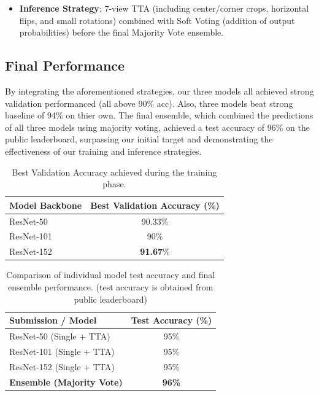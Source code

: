 \documentclass[a4paper, twocolumn]{article} %
\begin{document}
\begin{itemize}
\begin{itemize}
        \item \textbf{Backbone Freezing}: During the Warmup phase, the backbone was frozen to allow the new classification head to stabilize before fine-tuning the entire network. 5 epochs for ResNet-50 and ResNet-101, 10 epochs for ResNet-152.
    \end{itemize}
    \item \textbf{Inference Strategy}: 7-view TTA (including center/corner crops, horizontal flips, and small rotations) combined with Soft Voting (addition of output probabilities) before the final Majority Vote ensemble.
\end{itemize}

\subsection{Final Performance}
By integrating the aforementioned strategies, our three models all achieved strong validation performanced (all above 90\% acc). Also, three models beat strong baseline of 94\% on thier own. The final ensemble, which combined the predictions of all three models using majority voting, achieved a test accuracy of 96\% on the public leaderboard, surpassing our initial target and demonstrating the effectiveness of our training and inference strategies.
\begin{table}[h]
\centering
\caption{Best Validation Accuracy achieved during the training phase.}
\label{tab:val_acc}
\begin{tabular}{@{}lc@{}}
\toprule
\textbf{Model Backbone} & \textbf{Best Validation Accuracy (\%)} \\ \midrule
ResNet-50               & 90.33\%                    \\
ResNet-101              & 90\%                    \\
ResNet-152              & \textbf{91.67}\%                    \\ \bottomrule
\end{tabular}
\end{table}

\begin{table}[h]
\centering
\caption{Comparison of individual model test accuracy and final ensemble performance. (test accuracy is obtained from public leaderboard)}
\label{tab:test_acc}
\begin{tabular}{@{}lc@{}}
\toprule
\textbf{Submission / Model} & \textbf{Test Accuracy (\%)} \\ \midrule
ResNet-50 (Single + TTA)    & 95\%        \\
ResNet-101 (Single + TTA)   & 95\%        \\
ResNet-152 (Single + TTA)   & 95\%        \\ \midrule
\textbf{Ensemble (Majority Vote)} & \textbf{96\%}            \\ \bottomrule
\end{tabular}
\end{table}
\end{document}
